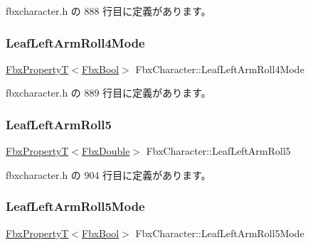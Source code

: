  fbxcharacter.\+h の 888 行目に定義があります。

\mbox{\label{class_fbx_character_ac3828ba481f4976a8b14b411bbf146d2}} 
\subsubsection{\texorpdfstring{Leaf\+Left\+Arm\+Roll4\+Mode}{LeafLeftArmRoll4Mode}}
{\footnotesize\ttfamily \hyperlink{class_fbx_property_t}{Fbx\+PropertyT}$<$\hyperlink{fbxtypes_8h_a92e0562b2fe33e76a242f498b362262e}{Fbx\+Bool}$>$ Fbx\+Character\+::\+Leaf\+Left\+Arm\+Roll4\+Mode}



 fbxcharacter.\+h の 889 行目に定義があります。

\mbox{\label{class_fbx_character_afcd2329e11115fd6a891e64a4fe0ba8d}} 
\subsubsection{\texorpdfstring{Leaf\+Left\+Arm\+Roll5}{LeafLeftArmRoll5}}
{\footnotesize\ttfamily \hyperlink{class_fbx_property_t}{Fbx\+PropertyT}$<$\hyperlink{fbxtypes_8h_a171e72a1c46fc15c1a6c9c31948c1c5b}{Fbx\+Double}$>$ Fbx\+Character\+::\+Leaf\+Left\+Arm\+Roll5}



 fbxcharacter.\+h の 904 行目に定義があります。

\mbox{\label{class_fbx_character_a79498d23bc3a1780dd984e6e5b788b99}} 
\subsubsection{\texorpdfstring{Leaf\+Left\+Arm\+Roll5\+Mode}{LeafLeftArmRoll5Mode}}
{\footnotesize\ttfamily \hyperlink{class_fbx_property_t}{Fbx\+PropertyT}$<$\hyperlink{fbxtypes_8h_a92e0562b2fe33e76a242f498b362262e}{Fbx\+Bool}$>$ Fbx\+Character\+::\+Leaf\+Left\+Arm\+Roll5\+Mode}



